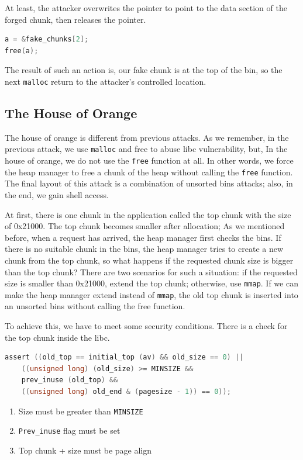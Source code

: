 \documentclass{masterthesis}
\newcommand*\ub{unsorted bins}
\newcommand*\mallocc{\lstinline{malloc}\xspace}
\newcommand*\freec{\lstinline{free}\xspace}
\newcommand*\mmapc{\lstinline{mmap}\xspace}
\begin{document}
At least, the attacker overwrites the pointer to point to the data section of the forged chunk, then releases the pointer.

\begin{lstlisting}[language=c,frame=tlrb]
a = &fake_chunks[2];
free(a);
\end{lstlisting}

The result of such an action is, our fake chunk is at the top of the bin, so the next \mallocc{} return to the attacker's controlled location.

\subsection{The House of Orange}
\label{subsect:houseorange}
The house of orange is different from previous attacks. As we remember, in the previous attack, we use \mallocc{} and free to abuse libc vulnerability, but, In the house of orange, we do not use the \freec{} function at all. In other words, we force the heap manager to free a chunk of the heap without calling the \freec{} function. The final layout of this attack is a combination of \ub{} attacks; also, in the end, we gain shell access.

At first, there is one chunk in the application called the top chunk with the size of 0x21000. The top chunk becomes smaller after allocation; As we mentioned before, when a request has arrived, the heap manager first checks the bins. If there is no suitable chunk in the bins, the heap manager tries to create a new chunk from the top chunk, so what happens if the requested chunk size is bigger than the top chunk? There are two scenarios for such a situation: if the requested size is smaller than 0x21000, extend the top chunk; otherwise, use \mmapc{}. If we can make the heap manager extend instead of \mmapc{}, the old top chunk is inserted into an \ub{} without calling the free function.

To achieve this, we have to meet some security conditions. There is a check for the top chunk inside the libc.
\begin{lstlisting}[language=c,frame=tlrb]
 assert ((old_top == initial_top (av) && old_size == 0) ||
	((unsigned long) (old_size) >= MINSIZE &&
	prev_inuse (old_top) &&
	((unsigned long) old_end & (pagesize - 1)) == 0));
\end{lstlisting}

\begin{enumerate}
	\item Size must be greater than \lstinline{MINSIZE}
	\item \lstinline{Prev_inuse} flag must be set
	\item Top chunk + size must be page align
\end{enumerate}
\end{document}
